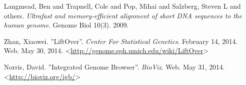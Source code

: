   Langmead, Ben and Trapnell, Cole and Pop, Mihai and Salzberg, Steven L and others.
  \textit{Ultrafast and memory-efficient alignment of short DNA sequences to the human genome}.
  Genome Biol 10(3).
  2009.

  Zhan, Xiaowei. ''LiftOver''. \textit{Center For Statistical Genetics}. February
  14, 2014. Web. May 30, 2014. <\url{http://genome.sph.umich.edu/wiki/LiftOver}>

  Norris, David. ''Integrated Genome Browser''. \textit{BioViz}. Web. May 31,
  2014. <\url{http://bioviz.org/igb/}> 
